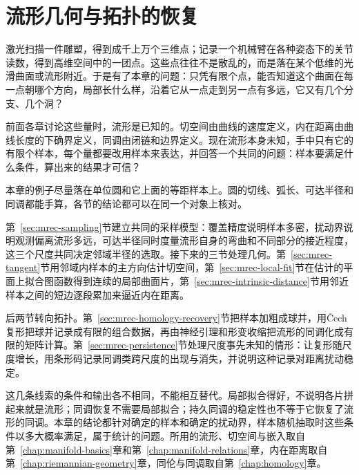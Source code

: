 \chapter{流形几何与拓扑的恢复}
\label{chap:manifold-recovery}

激光扫描一件雕塑，得到成千上万个三维点；记录一个机械臂在各种姿态下的关节读数，得到高维空间中的一团点。这些点往往不是散乱的，而是落在某个低维的光滑曲面或流形附近。于是有了本章的问题：只凭有限个点，能否知道这个曲面在每一点朝哪个方向，局部长什么样，沿着它从一点走到另一点有多远，它又有几个分支、几个洞？

前面各章讨论这些量时，流形是已知的。切空间由曲线的速度定义，内在距离由曲线长度的下确界定义，同调由闭链和边界定义。现在流形本身未知，手中只有它的有限个样本，每个量都要改用样本来表达，并回答一个共同的问题：样本要满足什么条件，算出来的结果才可信？

本章的例子尽量落在单位圆和它上面的等距样本上。圆的切线、弧长、可达半径和同调都能手算，各节的结论都可以在同一个对象上核对。

第~\ref{sec:mrec-sampling}节建立共同的采样模型：覆盖精度说明样本多密，扰动界说明观测偏离流形多远，可达半径同时度量流形自身的弯曲和不同部分的接近程度，这三个尺度共同决定邻域半径的选取。接下来的三节处理几何。第~\ref{sec:mrec-tangent}节用邻域内样本的主方向估计切空间，第~\ref{sec:mrec-local-fit}节在估计的平面上拟合图函数得到连续的局部曲面片，第~\ref{sec:mrec-intrinsic-distance}节用邻近样本之间的短边逐段累加来逼近内在距离。

后两节转向拓扑。第~\ref{sec:mrec-homology-recovery}节把样本加粗成球并，用Čech复形把球并记录成有限的组合数据，再由神经引理和形变收缩把流形的同调化成有限的矩阵计算。第~\ref{sec:mrec-persistence}节处理尺度事先未知的情形：让复形随尺度增长，用条形码记录同调类跨尺度的出现与消失，并说明这种记录对距离扰动稳定。

这几条线索的条件和输出各不相同，不能相互替代。局部拟合得好，不说明各片拼起来就是流形；同调恢复不需要局部拟合；持久同调的稳定性也不等于它恢复了流形的同调。本章的结论都针对确定的样本和确定的扰动界，样本随机抽取时这些条件以多大概率满足，属于统计的问题。所用的流形、切空间与嵌入取自第~\ref{chap:manifold-basics}章和第~\ref{chap:manifold-relations}章，内在距离取自第~\ref{chap:riemannian-geometry}章，同伦与同调取自第~\ref{chap:homology}章。










